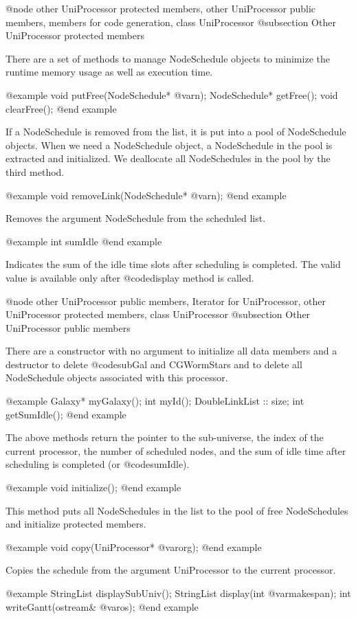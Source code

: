 @node other UniProcessor protected members, other UniProcessor public members, members for code generation, class UniProcessor
@subsection Other UniProcessor protected members

There are a set of methods to manage NodeSchedule objects to minimize
the runtime memory usage as well as execution time.

@example
void putFree(NodeSchedule* @var{n});
NodeSchedule* getFree();
void clearFree();
@end example

If a NodeSchedule is removed from the list, it is put into a pool of
NodeSchedule objects. When we need a NodeSchedule object, a NodeSchedule
in the pool is extracted and initialized. We deallocate all NodeSchedules in
the pool by the third method.

@example
void removeLink(NodeSchedule* @var{n});
@end example

Removes the argument NodeSchedule from the scheduled list.

@example
int sumIdle
@end example

Indicates the sum of the idle time slots after scheduling is completed.
The valid value is available only after @code{display} method is called.

@node other UniProcessor public members, Iterator for UniProcessor, other UniProcessor protected members, class UniProcessor
@subsection Other UniProcessor public members

There are a constructor with no argument to initialize all data members and
a destructor to delete @code{subGal} and CGWormStars and to delete all
NodeSchedule objects associated with this processor.

@example
Galaxy* myGalaxy();
int myId();
DoubleLinkList :: size;
int getSumIdle();
@end example

The above methods return the pointer to the sub-universe, the index of
the current processor, the number of scheduled nodes, and the sum of idle
time after scheduling is completed (or @code{sumIdle}).

@example
void initialize();
@end example

This method puts all NodeSchedules in the list to the pool of free
NodeSchedules and initialize protected members.

@example
void copy(UniProcessor* @var{org});
@end example

Copies the schedule from the argument UniProcessor to the current processor.

@example
StringList displaySubUniv();
StringList display(int @var{makespan});
int writeGantt(ostream& @var{os});
@end example

